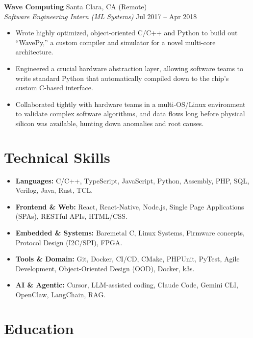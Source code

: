 \documentclass[letterpaper,10pt]{article}
\begin{document}
\vspace{10pt}

\noindent \textbf{Wave Computing} \hfill Santa Clara, CA (Remote) \\
\textit{Software Engineering Intern (ML Systems)} \hfill Jul 2017 -- Apr 2018
\begin{itemize}
    \item Wrote highly optimized, object-oriented C/C++ and Python to build out ``WavePy,'' a custom compiler and simulator for a novel multi-core architecture.
    \item Engineered a crucial hardware abstraction layer, allowing software teams to write standard Python that automatically compiled down to the chip's custom C-based interface.
    \item Collaborated tightly with hardware teams in a multi-OS/Linux environment to validate complex software algorithms, and data flows long before physical silicon was available, hunting down anomalies and root causes.
\end{itemize}

\section{Technical Skills}
\begin{itemize}
    \item \textbf{Languages:} C/C++, TypeScript, JavaScript, Python, Assembly, PHP, SQL, Verilog, Java, Rust, TCL.
    \item \textbf{Frontend \& Web:} React, React-Native, Node.js, Single Page Applications (SPAs), RESTful APIs, HTML/CSS.
    \item \textbf{Embedded \& Systems:} Baremetal C, Linux Systems, Firmware concepts, Protocol Design (I2C/SPI), FPGA.
    \item \textbf{Tools \& Domain:} Git, Docker, CI/CD, CMake, PHPUnit, PyTest, Agile Development, Object-Oriented Design (OOD), Docker, k3s.
    \item \textbf{AI \& Agentic:} Cursor, LLM-assisted coding, Claude Code, Gemini CLI, OpenClaw, LangChain, RAG.
\end{itemize}

\section{Education}
\end{document}
